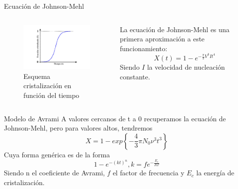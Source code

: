 \documentclass[11pt]{beamer}
\begin{document}
		\begin{frame}{Ecuación de Johnson-Mehl}
			\begin{columns}[T]	
				\begin{column}{.49\textwidth}
					\begin{figure}
						\includegraphics[scale=0.5]{img/cristalization_vs_tiempo.png}
						\caption*{Esquema cristalización en función del tiempo}
					\end{figure}
				\end{column}
				\begin{column}{.49\textwidth}
				La ecuación de Johnson-Mehl es una primera aproximación a este funcionamiento:
				\begin{equation}
					X(t)=1-e^{-\frac{\pi}{3}V^3 I t^4}
				\end{equation}
					Siendo $I$ la velocidad de nucleación constante.
				\end{column}
			\end{columns}
		\end{frame}
		\begin{frame}{Modelo de Avrami}
			A valores cercanos de t a 0 recuperamos la ecuación de Johnson-Mehl, pero para valores altos, tendremos
			\begin{equation}
				X = 1 - exp\left\lbrace -\frac{4}{3} \pi N_0 \nu^3 t^3 \right\rbrace
			\end{equation}		 
			Cuya forma genérica es de la forma 
			\begin{equation}
				1 - e^{-(kt)^n}, k=fe^{-\frac{E_c}{RT}}
			\end{equation} 
			Siendo n el coeficiente de Avrami, $f$ el factor de frecuencia y $E_c$ la energía de cristalización.
		\end{frame}
		
\end{document}
